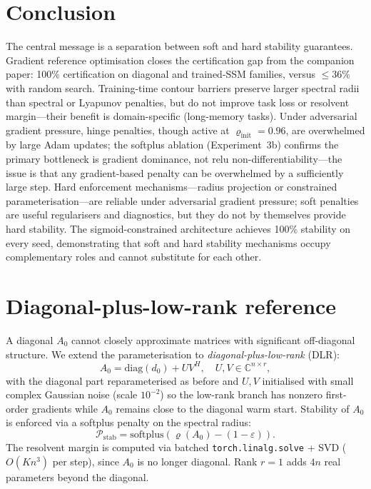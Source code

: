 \documentclass{article}
\theoremstyle{definition}
\newcommand{\C}{\mathbb{C}}
\begin{document}
\section{Conclusion}
\label{sec:conclusion}

The central message is a separation between soft and hard stability
guarantees.  Gradient reference optimisation closes the certification gap
from the companion paper: 100\% certification on diagonal and trained-SSM families,
versus $\leq 36\%$ with random search.  Training-time contour barriers
preserve larger spectral radii than spectral or Lyapunov penalties, but
do not improve task loss or resolvent margin---their benefit is
domain-specific (long-memory tasks).  Under adversarial gradient pressure,
hinge penalties, though active at $\varrho_\mathrm{init}=0.96$, are
overwhelmed by large Adam updates; the softplus ablation
(Experiment~3b) confirms the primary bottleneck is gradient dominance,
not relu non-differentiability---the issue is that any gradient-based
penalty can be overwhelmed by a sufficiently large step.  Hard enforcement mechanisms---radius projection or constrained
parameterisation---are reliable under adversarial gradient pressure; soft
penalties are useful regularisers and diagnostics, but they do not by
themselves provide hard stability.  The sigmoid-constrained architecture
achieves 100\% stability on every seed, demonstrating that soft and hard
stability mechanisms occupy complementary roles and cannot substitute for
each other.

\appendix

\section{Diagonal-plus-low-rank reference}
\label{app:dlr}

A diagonal $A_0$ cannot closely approximate matrices with significant
off-diagonal structure.  We extend the parameterisation to
\emph{diagonal-plus-low-rank} (DLR):
\[
  A_0 = \mathrm{diag}(d_0) + U V^H, \quad U, V \in \C^{n \times r},
\]
with the diagonal part reparameterised as before and $U, V$
initialised with small complex Gaussian noise (scale $10^{-2}$) so
the low-rank branch has nonzero first-order gradients while $A_0$
remains close to the diagonal warm start.  Stability of $A_0$
is enforced via a softplus penalty on the spectral radius:
\[
  \mathcal{P}_{\mathrm{stab}} = \mathrm{softplus}(\varrho(A_0) - (1 - \varepsilon)).
\]
The resolvent margin is computed via batched
\texttt{torch.linalg.solve} + SVD ($O(Kn^3)$ per step), since $A_0$
is no longer diagonal.  Rank $r = 1$ adds $4n$ real parameters beyond
the diagonal.
\end{document}
